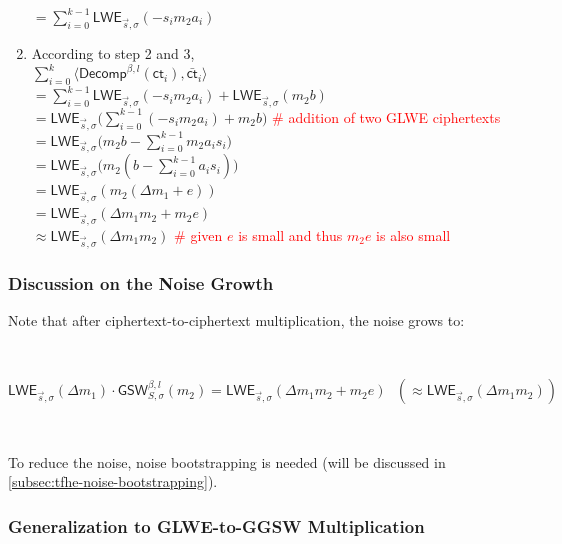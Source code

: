 \begin{enumerate}
$= \sum\limits_{i=0}^{k-1}\textsf{LWE}_{\vec{s}, \sigma}(-s_im_2a_i)$
\item According to step 2 and 3, \\
$\sum\limits_{i=0}^{k}\langle \textsf{Decomp}^{\beta, l}(\textsf{ct}_i), \bar{\textsf{ct}}_i \rangle$ \\
$= \sum\limits_{i=0}^{k-1}\textsf{LWE}_{\vec{s}, \sigma}(-s_im_2a_i) + \textsf{LWE}_{\vec{s}, \sigma} (m_{2}b)$ \\ 
$= \textsf{LWE}_{\vec{s}, \sigma}\Big(\sum\limits_{i=0}^{k-1}(-s_im_2a_i) + m_{2}b\Big)$ \textcolor{red}{\# addition of two GLWE ciphertexts} \\ 
$= \textsf{LWE}_{\vec{s}, \sigma}\Big(m_2b - \sum\limits_{i=0}^{k-1}m_2a_is_i\Big)$  \\ 
$= \textsf{LWE}_{\vec{s}, \sigma}\Big(m_2(b - \sum\limits_{i=0}^{k-1}a_is_i)\Big)$\\
$= \textsf{LWE}_{\vec{s}, \sigma}(m_2(\Delta m_1 + e))$ \\
$= \textsf{LWE}_{\vec{s}, \sigma}(\Delta m_1m_2 + m_2e)$ \\
$\approx \textsf{LWE}_{\vec{s}, \sigma}(\Delta m_1m_2)$ \textcolor{red}{\# given $e$ is small and thus $m_2e$ is also small}
\end{enumerate}

\subsubsection{Discussion on the Noise Growth}

Note that after ciphertext-to-ciphertext multiplication, the noise grows to: 

$ $

$\textsf{LWE}_{\vec{s}, \sigma}(\Delta m_1) \cdot \textsf{GSW}_{S, \sigma}^{\beta, l}(m_2) = \textsf{LWE}_{\vec{s}, \sigma}(\Delta m_1m_2 + m_2e) \text{ } (\approx \textsf{LWE}_{\vec{s}, \sigma}(\Delta m_1m_2))$

$ $

\noindent 
To reduce the noise, noise bootstrapping is needed (will be discussed in \autoref{subsec:tfhe-noise-bootstrapping}).

\subsubsection{Generalization to GLWE-to-GGSW Multiplication}
\label{subsubsec:tfhe-glwe-to-ggsw-multiplication}

